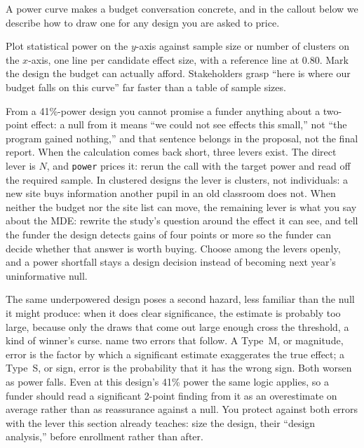 \documentclass[
    a4paper,
    fontsize=10pt,
    twoside=true,
    numbers=noenddot,
]{kaobook}
\newenvironment{vizcallout}[1][Visualization to build]{%
    \begin{vizbox}[frametitle={#1}]%
}{%
    \end{vizbox}%
}
\begin{document}
A power curve makes a budget conversation concrete, and in the callout below we describe how to draw one for any design you are asked to price.

\begin{vizcallout}[Visualization to build: the power curve]
Plot statistical power on the $y$-axis against sample size or number of clusters on the $x$-axis, one line per candidate effect size, with a reference line at 0.80. Mark the design the budget can actually afford. Stakeholders grasp \enquote{here is where our budget falls on this curve} far faster than a table of sample sizes.
\end{vizcallout}

From a 41\%-power design you cannot promise a funder anything about a two-point effect: a null from it means \enquote{we could not see effects this small,} not \enquote{the program gained nothing,} and that sentence belongs in the proposal, not the final report. When the calculation comes back short, three levers exist. The direct lever is $N$, and \texttt{power} prices it: rerun the call with the target power and read off the required sample. In clustered designs the lever is clusters, not individuals: a new site buys information another pupil in an old classroom does not. When neither the budget nor the site list can move, the remaining lever is what you say about the MDE: rewrite the study's question around the effect it can see, and tell the funder the design detects gains of four points or more so the funder can decide whether that answer is worth buying. Choose among the levers openly, and a power shortfall stays a design decision instead of becoming next year's uninformative null.

The same underpowered design poses a second hazard, less familiar than the null it might produce: when it does clear significance, the estimate is probably too large, because only the draws that come out large enough cross the threshold, a kind of winner's curse. \textcite{gelman2014power} name two errors that follow. A Type~M, or magnitude, error is the factor by which a significant estimate exaggerates the true effect; a Type~S, or sign, error is the probability that it has the wrong sign. Both worsen as power falls. Even at this design's 41\% power the same logic applies, so a funder should read a significant 2-point finding from it as an overestimate on average rather than as reassurance against a null. You protect against both errors with the lever this section already teaches: size the design, their \enquote{design analysis,} before enrollment rather than after.
\end{document}
